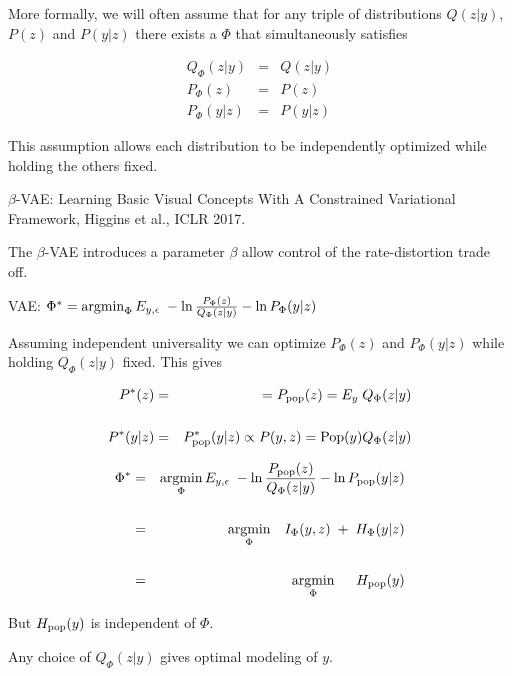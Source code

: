 {

More formally, we will often assume that for any triple of distributions $Q(z|y)$, $P(z)$ and $P(y|z)$ there exists a $\Phi$ that {\color{red} simultaneously} satisfies

\begin{eqnarray*}
Q_\Phi(z|y) & = & Q(z|y) \\
P_\Phi(z) & = & P(z) \\
P_\Phi(y|z) & = & P(y|z)
\end{eqnarray*}

\vfill
This assumption allows each distribution to be independently optimized while holding the others fixed.


$\beta$-VAE: Learning Basic Visual Concepts With A
Constrained Variational Framework, Higgins et al., ICLR 2017.

\vfill
The $\beta$-VAE introduces a parameter $\beta$ allow control of the rate-distortion trade off.


VAE: $\Phi^* = \operatorname*{argmin}_\Phi E_{y,\epsilon}\;-\ln \frac{P_\Phi(z)}{Q_\Phi(z|y)} - \ln P_\Phi(y|z)$

\vfill
Assuming independent universality we can optimize $P_\Phi(z)$ and $P_\Phi(y|z)$ while holding $Q_\Phi(z|y)$ fixed.
This gives

\begin{eqnarray*}
P^*(z) & = & = P_{\mathrm{pop}}(z) = E_y \;Q_\Phi(z|y) \\
\\
P^*(y|z) & = & P^*_{\mathrm{pop}}(y|z) \propto P(y,z) = \mathrm{Pop}(y)Q_\Phi(z|y)
\end{eqnarray*}


\begin{eqnarray*}
\Phi^* & = & \operatorname*{argmin}_\Phi E_{y,\epsilon}\;-\ln \frac{P_{\mathrm{pop}}(z)}{Q_\Phi(z|y)} - \ln P_{\mathrm{pop}}(y|z) \\
\\
& = & \operatorname*{argmin}_\Phi \;\;\;I_\Phi(y,z)\; + \; H_\Phi(y|z) \\
\\
& = & \operatorname*{argmin}_\Phi \;\;\;\;\; H_{\mathrm{pop}}(y)
\end{eqnarray*}

\vfill
But $H_{\mathrm{pop}}(y)$ is independent of $\Phi$.

\vfill
Any choice of $Q_\Phi(z|y)$ gives optimal modeling of $y$.

}
